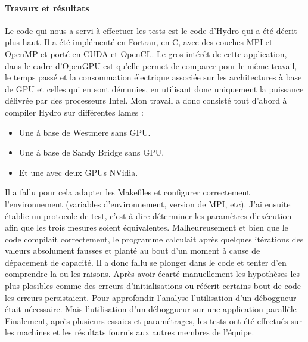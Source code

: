 \documentclass[11pt]{article}
\begin{document}
				\paragraph{Travaux et résultats}
				Le code qui nous a servi à effectuer les tests est le code d'Hydro qui a été décrit plus haut. Il a été 
				implémenté en Fortran, en C, avec des couches MPI et OpenMP et porté en CUDA et OpenCL.
				Le gros intérêt de cette application, dans le cadre d'OpenGPU est qu'elle permet de comparer pour le même 
				travail, le temps passé et la consommation électrique associée sur les architectures à base de GPU et celles 
				qui en sont démunies, en utilisant donc uniquement la puissance délivrée par des processeurs Intel.
				Mon travail a donc consisté tout d'abord à compiler Hydro sur différentes lames : \newline
				\begin{itemize}
				\item Une à base de Westmere sans GPU.
				\item Une à base de Sandy Bridge sans GPU.
				\item Et une avec deux GPUs NVidia. \newline
				\end{itemize}
				Il a fallu pour cela adapter les Makefiles et configurer correctement l'environnement (variables 
				d'environnement, version de MPI, etc). 
				J'ai ensuite établie un protocole de test, c'est-à-dire déterminer les paramètres d'exécution afin que les trois 
				mesures soient équivalentes. \newline
				Malheureusement et bien que le code compilait correctement, le programme calculait après quelques itérations des valeurs absolument 
				fausses et planté au bout d'un moment à cause de dépacement de capacité. Il a donc fallu se plonger dans le code et tenter d'en comprendre 
				la ou les raisons. Après avoir écarté manuellement les hypothèses les plus plosibles comme des erreurs d'initialisations ou réécrit certains 
				bout de code les erreurs persistaient. Pour approfondir l'analyse l'utilisation d'un déboggueur était nécessaire. Mais l'utilisation d'un déboggueur
				sur une application parallèle
				Finalement, après plusieurs essaies et paramétrages, les tests ont été effectués 
				sur les machines et les résultats fournis aux autres membres de l'équipe.
\end{document}
